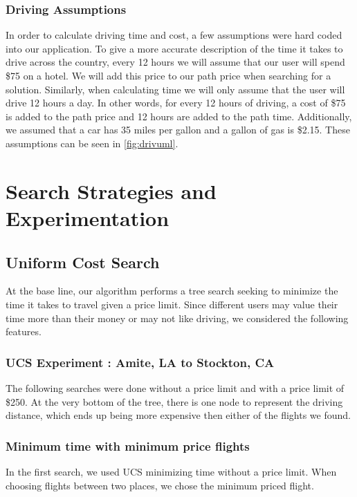\documentclass[11pt]{article}
\begin{document}
\subsubsection{Driving Assumptions}

In order to calculate driving time and cost, a few assumptions were hard coded into our application. To give a more accurate description of the time it takes to drive across the country, every 12 hours we will assume that our user will spend \$75 on a hotel. We will add this price to our path price when searching for a solution. Similarly, when calculating time we will only assume that the user will drive 12 hours a day. In other words, for every 12 hours of driving, a cost of \$75 is added to the path price and 12 hours are added to the path time. Additionally, we assumed that a car has 35 miles per gallon and a gallon of gas is \$2.15.
These assumptions can be seen in \ref{fig:drivuml}.


\section{Search Strategies and Experimentation}\label{sec:search}

\subsection{Uniform Cost Search}

At the base line, our algorithm performs a tree search seeking to minimize the time it takes to travel given a price limit. 
Since different users may value their time more than their money or may not like driving, we considered the following features.

\subsubsection{UCS Experiment : Amite, LA to Stockton, CA}

The following searches were done without a price limit and with a price limit of \$250. At the very bottom of the tree, there is one node to represent the driving distance, which ends up being more expensive then either of the flights we found. 

\subsubsection{Minimum time with minimum price flights}\label{sec:sol}

In the first search, we used UCS minimizing time without a price limit. When choosing flights between two places, we chose the minimum priced flight.
\end{document}
